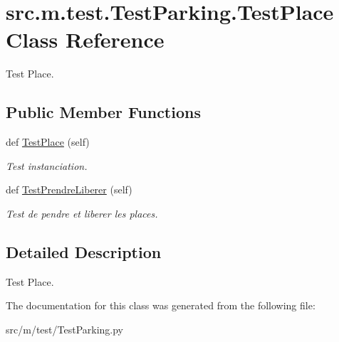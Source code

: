 \hypertarget{classsrc_1_1m_1_1test_1_1_test_parking_1_1_test_place}{}\section{src.\+m.\+test.\+Test\+Parking.\+Test\+Place Class Reference}
\label{classsrc_1_1m_1_1test_1_1_test_parking_1_1_test_place}


Test Place.  


\subsection*{Public Member Functions}
\begin{DoxyCompactItemize}
\item 
\hypertarget{classsrc_1_1m_1_1test_1_1_test_parking_1_1_test_place_aaa494b1ad4a8e2fc9c19f9764adc82cc}{}def \hyperlink{classsrc_1_1m_1_1test_1_1_test_parking_1_1_test_place_aaa494b1ad4a8e2fc9c19f9764adc82cc}{Test\+Place} (self)\label{classsrc_1_1m_1_1test_1_1_test_parking_1_1_test_place_aaa494b1ad4a8e2fc9c19f9764adc82cc}

\begin{DoxyCompactList}\small\item\em Test instanciation. \end{DoxyCompactList}\item 
\hypertarget{classsrc_1_1m_1_1test_1_1_test_parking_1_1_test_place_a35eb47f5cf0121801b3bfbff42587544}{}def \hyperlink{classsrc_1_1m_1_1test_1_1_test_parking_1_1_test_place_a35eb47f5cf0121801b3bfbff42587544}{Test\+Prendre\+Liberer} (self)\label{classsrc_1_1m_1_1test_1_1_test_parking_1_1_test_place_a35eb47f5cf0121801b3bfbff42587544}

\begin{DoxyCompactList}\small\item\em Test de pendre et liberer les places. \end{DoxyCompactList}\end{DoxyCompactItemize}


\subsection{Detailed Description}
Test Place. 

The documentation for this class was generated from the following file\+:\begin{DoxyCompactItemize}
\item 
src/m/test/Test\+Parking.\+py\end{DoxyCompactItemize}

